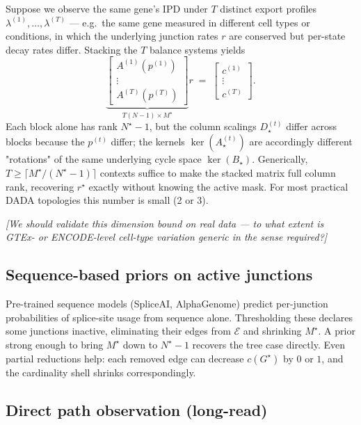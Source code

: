\documentclass[11pt, a4paper]{article}
\newcommand{\note}[1]{\textcolor{red!70!black}{\textit{[#1]}}}
\newcommand{\rstar}{r^{\star}}
\newcommand{\Gstar}{G^{\star}}
\newcommand{\Bstar}{B_{\star}}
\newcommand{\Dstar}{D_{\star}}
\begin{document}
Suppose we observe the same gene's IPD under $T$ distinct export profiles $\lambda^{(1)}, \dots, \lambda^{(T)}$ --- e.g.\ the same gene measured in different cell types or conditions, in which the underlying junction rates $r$ are conserved but per-state decay rates differ. Stacking the $T$ balance systems yields
\[
\underbrace{\begin{bmatrix} A^{(1)}(p^{(1)}) \\ \vdots \\ A^{(T)}(p^{(T)}) \end{bmatrix}}_{\text{$T(N-1) \times M^{\star}$}} r \;=\; \begin{bmatrix} c^{(1)} \\ \vdots \\ c^{(T)} \end{bmatrix}.
\]
Each block alone has rank $N^{\star} - 1$, but the column scalings $\Dstar^{(t)}$ differ across blocks because the $p^{(t)}$ differ; the kernels $\ker(A^{(t)}_{\star})$ are accordingly different "rotations" of the same underlying cycle space $\ker(\Bstar)$. Generically, $T \geq \lceil M^{\star} / (N^{\star} - 1) \rceil$ contexts suffice to make the stacked matrix full column rank, recovering $\rstar$ exactly without knowing the active mask. For most practical DADA topologies this number is small (2 or 3).

\note{We should validate this dimension bound on real data --- to what extent is GTEx- or ENCODE-level cell-type variation \emph{generic} in the sense required?}

\subsection{Sequence-based priors on active junctions}

Pre-trained sequence models (SpliceAI, AlphaGenome) predict per-junction probabilities of splice-site usage from sequence alone. Thresholding these declares some junctions inactive, eliminating their edges from $\mathcal{E}$ and shrinking $M^{\star}$. A prior strong enough to bring $M^{\star}$ down to $N^{\star} - 1$ recovers the tree case directly. Even partial reductions help: each removed edge can decrease $c(\Gstar)$ by $0$ or $1$, and the cardinality shell shrinks correspondingly.

\subsection{Direct path observation (long-read)}
\end{document}

